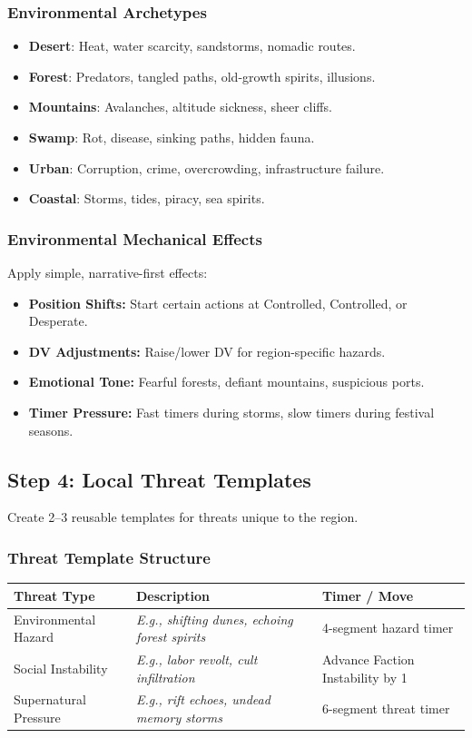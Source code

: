 \documentclass[11pt]{article}
\begin{document}
\subsubsection{Environmental Archetypes}
\begin{itemize}
    \item \textbf{Desert}: Heat, water scarcity, sandstorms, nomadic routes.
    \item \textbf{Forest}: Predators, tangled paths, old-growth spirits, illusions.
    \item \textbf{Mountains}: Avalanches, altitude sickness, sheer cliffs.
    \item \textbf{Swamp}: Rot, disease, sinking paths, hidden fauna.
    \item \textbf{Urban}: Corruption, crime, overcrowding, infrastructure failure.
    \item \textbf{Coastal}: Storms, tides, piracy, sea spirits.
\end{itemize}

\subsubsection{Environmental Mechanical Effects}
Apply simple, narrative-first effects:
\begin{itemize}
    \item \textbf{Position Shifts:} Start certain actions at Controlled, Controlled, or Desperate.
    \item \textbf{DV Adjustments:} Raise/lower DV for region-specific hazards.
    \item \textbf{Emotional Tone:} Fearful forests, defiant mountains, suspicious ports.
    \item \textbf{Timer Pressure:} Fast timers during storms, slow timers during festival seasons.
\end{itemize}

\subsection{Step 4: Local Threat Templates}

Create 2--3 reusable templates for threats unique to the region.

\subsubsection{Threat Template Structure}
\begin{center}
\begin{longtable}{|p{4cm}|p{5cm}|p{4cm}|}
\hline
\textbf{Threat Type} & \textbf{Description} & \textbf{Timer / Move} \\
\hline
Environmental Hazard & \emph{E.g., shifting dunes, echoing forest spirits} & 4-segment hazard timer \\
\hline
Social Instability & \emph{E.g., labor revolt, cult infiltration} & Advance Faction Instability by 1 \\
\hline
Supernatural Pressure & \emph{E.g., rift echoes, undead memory storms} & 6-segment threat timer \\
\hline
\end{longtable}
\end{center}
\end{document}
